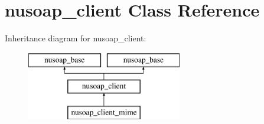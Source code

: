 \hypertarget{classnusoap__client}{}\section{nusoap\+\_\+client Class Reference}
\label{classnusoap__client}
Inheritance diagram for nusoap\+\_\+client\+:\begin{figure}[H]
\begin{center}
\leavevmode
\includegraphics[height=3.000000cm]{classnusoap__client}
\end{center}
\end{figure}
